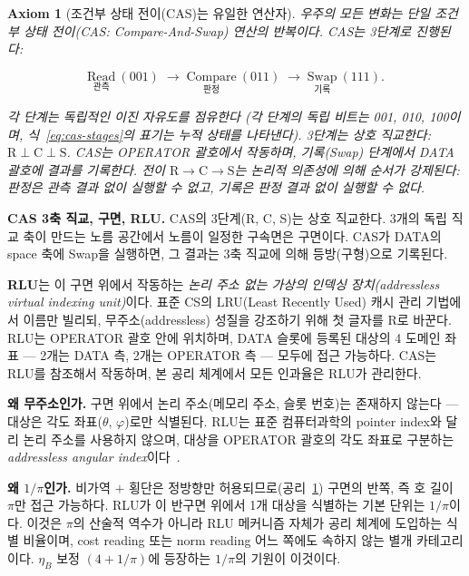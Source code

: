 \documentclass[entropy,article,submit,pdftex,oneauthor]{Definitions/mdpi}
\newtheorem{Axiom}{Axiom}
\begin{document}
\begin{Axiom}[조건부 상태 전이(CAS)는 유일한 연산자]\label{ax:cas}
우주의 모든 변화는 단일 조건부 상태 전이(CAS: Compare-And-Swap) 연산의 반복이다. CAS는 3단계로 진행된다:
\begin{linenomath}
\begin{equation}
\underset{\text{관측}}{\mathrm{Read}}\ (001) \;\longrightarrow\; \underset{\text{판정}}{\mathrm{Compare}}\ (011) \;\longrightarrow\; \underset{\text{기록}}{\mathrm{Swap}}\ (111).
\label{eq:cas-stages}
\end{equation}
\end{linenomath}
각 단계는 독립적인 이진 자유도를 점유한다 (각 단계의 독립 비트는 001, 010, 100이며, 식~\eqref{eq:cas-stages}의 표기는 누적 상태를 나타낸다). 3단계는 상호 직교한다: $\mathrm{R} \perp \mathrm{C} \perp \mathrm{S}$. CAS는 OPERATOR 괄호에서 작동하며, 기록(Swap) 단계에서 DATA 괄호에 결과를 기록한다. 전이 $\mathrm{R} \to \mathrm{C} \to \mathrm{S}$는 논리적 의존성에 의해 순서가 강제된다: 판정은 관측 결과 없이 실행할 수 없고, 기록은 판정 결과 없이 실행할 수 없다.
\end{Axiom}

\textbf{CAS 3축 직교, 구면, RLU.} CAS의 3단계(R, C, S)는 상호 직교한다. 3개의 독립 직교 축이 만드는 노름 공간에서 노름이 일정한 구속면은 구면이다. CAS가 DATA의 space 축에 Swap을 실행하면, 그 결과는 3축 직교에 의해 등방(구형)으로 기록된다.

\textbf{RLU}는 이 구면 위에서 작동하는 \emph{논리 주소 없는 가상의 인덱싱 장치(addressless virtual indexing unit)}이다. 표준 CS의 LRU(Least Recently Used) 캐시 관리 기법에서 이름만 빌리되, 무주소(addressless) 성질을 강조하기 위해 첫 글자를 R로 바꾼다. RLU는 OPERATOR 괄호 안에 위치하며, DATA 슬롯에 등록된 대상의 4 도메인 좌표 --- 2개는 DATA 측, 2개는 OPERATOR 측 --- 모두에 접근 가능하다. CAS는 RLU를 참조해서 작동하며, 본 공리 체계에서 모든 인과율은 RLU가 관리한다.

\textbf{왜 무주소인가.} 구면 위에서 논리 주소(메모리 주소, 슬롯 번호)는 존재하지 않는다 --- 대상은 각도 좌표($\theta$, $\varphi$)로만 식별된다. RLU는 표준 컴퓨터과학의 pointer index와 달리 논리 주소를 사용하지 않으며, 대상을 OPERATOR 괄호의 각도 좌표로 구분하는 \emph{addressless angular index}이다~\cite{han2026}.

\textbf{왜 $1/\pi$인가.} 비가역 $+$ 횡단은 정방향만 허용되므로(공리~\ref{ax:cas}) 구면의 반쪽, 즉 호 길이 $\pi$만 접근 가능하다. RLU가 이 반구면 위에서 1개 대상을 식별하는 기본 단위는 $1/\pi$이다. 이것은 $\pi$의 산술적 역수가 아니라 RLU 메커니즘 자체가 공리 체계에 도입하는 식별 비율이며, cost reading 또는 norm reading 어느 쪽에도 속하지 않는 별개 카테고리이다. $\eta_B$ 보정 $(4 + 1/\pi)$에 등장하는 $1/\pi$의 기원이 이것이다.
\end{document}
